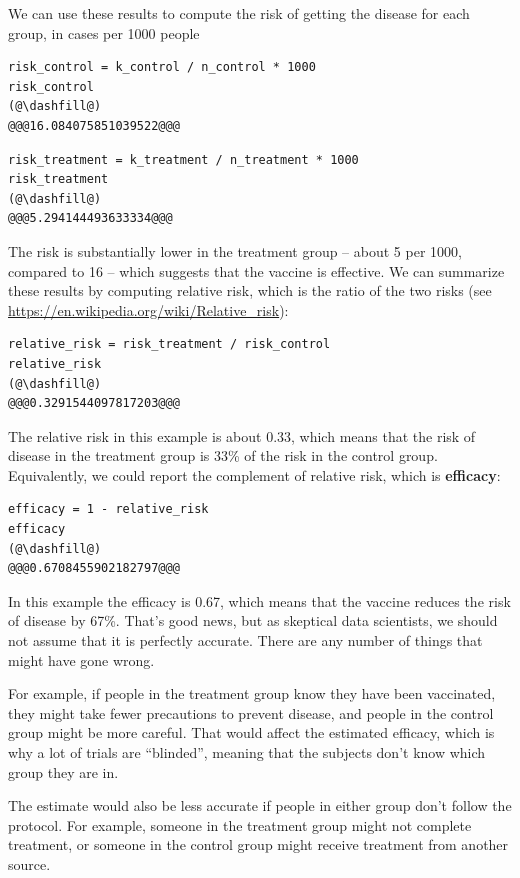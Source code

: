 We can use these results to compute the risk of getting the disease for
each group, in cases per 1000 people

\begin{lstlisting}[]
risk_control = k_control / n_control * 1000
risk_control
(@\dashfill@)
@@@16.084075851039522@@@
\end{lstlisting}

\begin{lstlisting}[]
risk_treatment = k_treatment / n_treatment * 1000
risk_treatment
(@\dashfill@)
@@@5.294144493633334@@@
\end{lstlisting}

The risk is substantially lower in the treatment group -- about 5 per
1000, compared to 16 -- which suggests that the vaccine is effective. We
can summarize these results by computing relative risk, which is the
ratio of the two risks (see
\url{https://en.wikipedia.org/wiki/Relative_risk}):

\begin{lstlisting}[]
relative_risk = risk_treatment / risk_control
relative_risk
(@\dashfill@)
@@@0.3291544097817203@@@
\end{lstlisting}

The relative risk in this example is about 0.33, which means that the
risk of disease in the treatment group is 33\% of the risk in the
control group. Equivalently, we could report the complement of relative
risk, which is \textbf{efficacy}:

\begin{lstlisting}[]
efficacy = 1 - relative_risk
efficacy
(@\dashfill@)
@@@0.6708455902182797@@@
\end{lstlisting}

In this example the efficacy is 0.67, which means that the vaccine
reduces the risk of disease by 67\%. That's good news, but as skeptical
data scientists, we should not assume that it is perfectly accurate.
There are any number of things that might have gone wrong.

For example, if people in the treatment group know they have been
vaccinated, they might take fewer precautions to prevent disease, and
people in the control group might be more careful. That would affect the
estimated efficacy, which is why a lot of trials are ``blinded'',
meaning that the subjects don't know which group they are in.

The estimate would also be less accurate if people in either group don't
follow the protocol. For example, someone in the treatment group might
not complete treatment, or someone in the control group might receive
treatment from another source.


